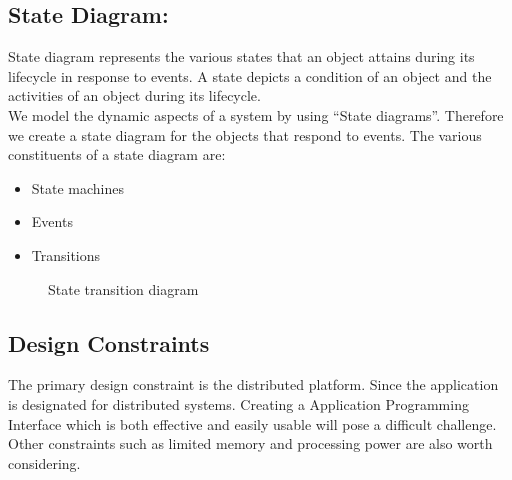 \documentclass[oneside,a4paper,12pt]{report}
\begin{document}
\subsection{State Diagram:}	
State diagram represents the various states that an object attains during its lifecycle in response to events. A state depicts a condition of an object and the activities of an object during its lifecycle. \\
	We model the dynamic aspects of a system by using “State diagrams”. Therefore we create a state diagram for the objects that respond to events. The various constituents of a state diagram are:
\begin{itemize}
\item State machines
\item Events
\item Transitions
\end{itemize}



\begin{center}
	\begin{figure}[H]
		\centering
	  \caption{State transition diagram}
	  \label{fig:state-dig}
	\end{figure}
\end{center} 
 
 \subsection{Design Constraints}	
The primary design constraint is the distributed platform. Since the application is designated for distributed systems. Creating a Application Programming  Interface which is both effective and easily usable will pose a difficult challenge. Other constraints such as limited memory and processing power are also worth considering.
\end{document}
